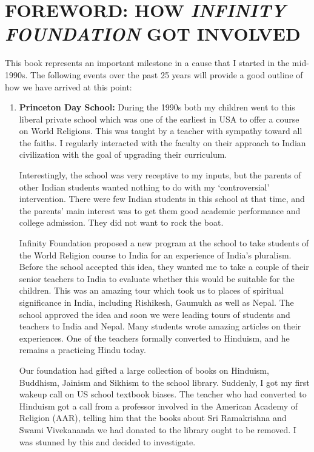 \chapter*{FOREWORD: HOW \textit{INFINITY FOUNDATION} GOT INVOLVED}

This book represents an important milestone in a cause that I started in the mid-1990s. The following events over the past 25 years will provide a good outline of how we have arrived at this point:

\begin{enumerate}
\item \textbf{Princeton Day School:} During the 1990s both my children went to this liberal private school which was one of the earliest in USA to offer a course on World Religions. This was taught by a teacher with sympathy toward all the faiths. I regularly interacted with the faculty on their approach to Indian civilization with the goal of upgrading their curriculum. 

Interestingly, the school was very receptive to my inputs, but the parents of other Indian students wanted nothing to do with my ‘controversial’ intervention. There were few Indian students in this school at that time, and the parents’ main interest was to get them good academic performance and college admission. They did not want to rock the boat.

Infinity Foundation proposed a new program at the school to take students of the World Religion course to India for an experience of India’s pluralism. Before the school accepted this idea, they wanted me to take a couple of their senior teachers to India to evaluate whether this would be suitable for the children. This was an amazing tour which took us to places of spiritual significance in India, including Rishikesh, Gaumukh as well as Nepal. The school approved the idea and soon we were leading tours of students and teachers to India and Nepal. Many students wrote amazing articles on their experiences. One of the teachers formally converted to Hinduism, and he remains a practicing Hindu today.

Our foundation had gifted a large collection of books on Hinduism, Buddhism, Jainism and Sikhism to the school library. Suddenly, I got my first wakeup call on US school textbook biases. The teacher who had converted to Hinduism got a call from a professor involved in the American Academy of Religion (AAR), telling him that the books about Sri Ramakrishna and Swami Vivekananda we had donated to the library ought to be removed. I was stunned by this and decided to investigate.


\end{enumerate}

